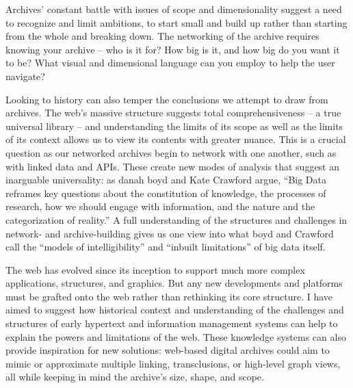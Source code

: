 Archives’ constant battle with issues of scope and dimensionality suggest a need to recognize and limit ambitions, to start small and build up rather than starting from the whole and breaking down. The networking of the archive requires knowing your archive – who is it for? How big is it, and how big do you want it to be? What visual and dimensional language can you employ to help the user navigate?

Looking to history can also temper the conclusions we attempt to draw from archives. The web’s massive structure suggests total comprehensiveness – a true universal library – and understanding the limits of its scope as well as the limits of its context allows us to view its contents with greater nuance. This is a crucial question as our networked archives begin to network with one another, such as with linked data and APIs. These create new modes of analysis that suggest an inarguable universality: as danah boyd and Kate Crawford argue, “Big Data reframes key questions about the constitution of knowledge, the processes of research, how we should engage with information, and the nature and the categorization of reality.”  A full understanding of the structures and challenges in network- and archive-building gives us one view into what boyd and Crawford call the “models of intelligibility” and “inbuilt limitations” of big data itself.

The web has evolved since its inception to support much more complex applications, structures, and graphics. But any new developments and platforms must be grafted onto the web rather than rethinking its core structure. I have aimed to suggest how historical context and understanding of the challenges and structures of early hypertext and information management systems can help to explain the powers and limitations of the web. These knowledge systems can also provide inspiration for new solutions: web-based digital archives could aim to mimic or approximate multiple linking, transclusions, or high-level graph views, all while keeping in mind the archive’s size, shape, and scope.
